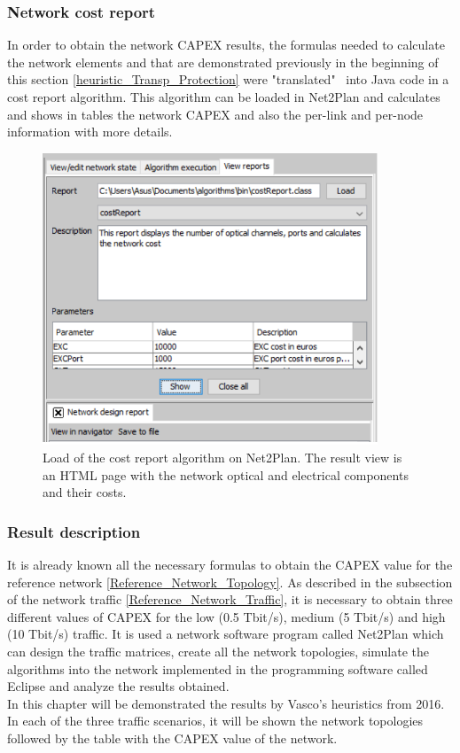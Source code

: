 \newpage
\subsubsection{Network cost report}

\vspace{11pt}
In order to obtain the network CAPEX results, the formulas needed to calculate the network elements and that are demonstrated previously in the beginning of this section \ref{heuristic_Transp_Protection} were "translated" \ into Java code in a cost report algorithm. This algorithm can be loaded in Net2Plan and calculates and shows in tables the network CAPEX and also the per-link and per-node information with more details.

\begin{figure}[H]
\centering
\includegraphics[width=10cm]{sdf/heuristic/transparent_protection/figures/cost_report_transparent}
\caption{Load of the cost report algorithm on Net2Plan. The result view is an HTML page with the network optical and electrical components and their costs.}
\label{cost_report_transparent_protec}
\end{figure}

\newpage
\subsubsection{Result description}\label{result_description_transparent_heuristic_protec}

It is already known all the necessary formulas to obtain the CAPEX value for the reference network \ref{Reference_Network_Topology}. As described in the subsection of the network traffic \ref{Reference_Network_Traffic}, it is necessary to obtain three different values of CAPEX for the low (0.5 Tbit/s), medium (5 Tbit/s) and high (10 Tbit/s) traffic. It is used a network software program called Net2Plan which can design the traffic matrices, create all the network topologies, simulate the algorithms into the network implemented in the programming software called Eclipse and analyze the results obtained.\\
In this chapter will be demonstrated the results by Vasco's heuristics from 2016. In each of the three traffic scenarios, it will be shown the network topologies followed by the table with the CAPEX value of the network.\\

